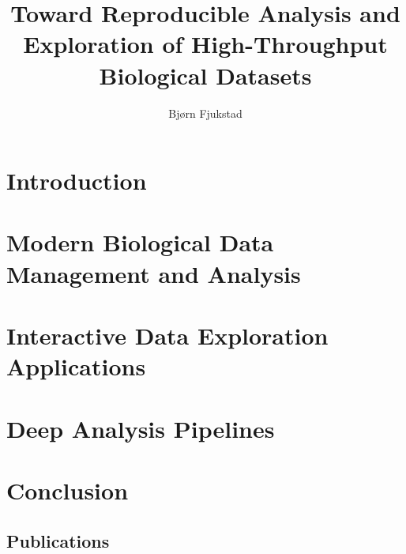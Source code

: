 \documentclass[USenglish,phd]{uit-thesis}
\begin{document}
 

\title{Toward Reproducible Analysis and Exploration of High-Throughput
Biological Datasets}
\author{Bjørn Fjukstad}



\maketitle

\frontmatter

\begin{epigraph}
\end{epigraph}

 
% 

\tableofcontents

\printglossary[type=\acronymtype]

\mainmatter

\chapter{Introduction}
 

\chapter{Modern Biological Data Management and Analysis}\label{biodata}


\chapter{Interactive Data Exploration Applications}\label{interactive}


\chapter{Deep Analysis Pipelines}\label{pipeline}  


\chapter{Conclusion}
 


\backmatter




\appendix
\begin{appendix}
    \chapter{Publications}
\end{appendix}
\end{document}
